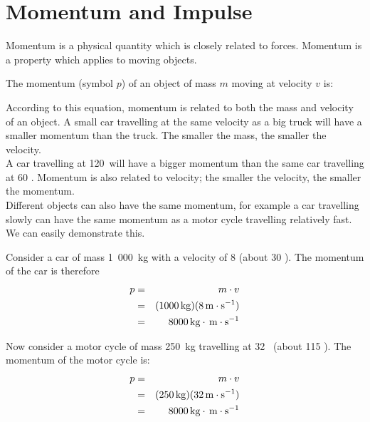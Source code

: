 \section{Momentum and Impulse}

Momentum is a physical quantity which is closely related to forces. Momentum is a property which applies to moving objects.


The momentum (symbol $p$) of an object of mass $m$ moving at velocity $v$ is:

According to this equation, momentum is related to both the mass and velocity of an object. A small car travelling at the same velocity as a big truck will have a smaller momentum than the truck. The smaller the mass, the smaller the velocity.\\
A car travelling at 120~\kph will have a bigger momentum than the same car travelling at 60 \kph. Momentum is also related to velocity; the smaller the velocity, the smaller the momentum.\\
Different objects can also have the same momentum, for example a car travelling slowly can have the same momentum as a motor cycle travelling relatively fast. We can easily demonstrate this.

 Consider a car of mass 1~000~kg with a velocity of 8 \ms (about 30 \kph). The momentum of the car is therefore
\begin{eqnarray*}
p&=&m \cdot v\\
&=& (1000 \,\mathrm{kg})(8 \,\mathrm{m \cdot s^{-1}})\\
&=& 8000 \,\mathrm{kg}\cdot\,\mathrm{m \cdot s^{-1}}
\end{eqnarray*}

Now consider a motor cycle of mass 250~kg travelling at 32 \ms\ (about 115 \kph). The momentum of the motor cycle is:
\begin{eqnarray*}
p&=&m \cdot v\\
&=& (250 \,\mathrm{kg})(32 \,\mathrm{m \cdot s^{-1}})\\
&=& 8000 \,\mathrm{kg} \cdot \,\mathrm{m \cdot s^{-1}}
\end{eqnarray*}

